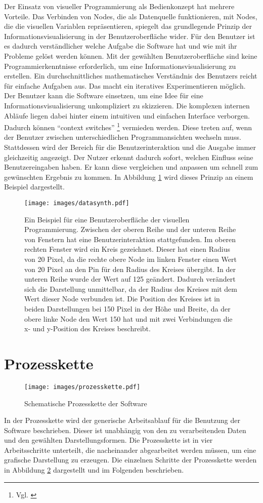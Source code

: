 \documentclass[a4paper, 
               12pt,
               DIV=calc,
               version=first,
               pdftex,
               headsepline,
               footsepline,
               bibliography=totocnumbered,
               listof=numbered]{scrreprt}
\begin{document}
Der Einsatz von visueller Programmierung als Bedienkonzept hat
mehrere Vorteile. Das Verbinden von Nodes, die als Datenquelle funktionieren, mit Nodes, die
die visuellen Variablen repräsentieren, spiegelt das grundlegende
Prinzip der Informationsvisualisierung in der Benutzeroberfläche wider. Für den Benutzer ist
es dadurch verständlicher welche Aufgabe die Software hat und wie mit ihr Probleme gelöst
werden können.
Mit der gewählten Benutzeroberfläche sind keine Programmierkenntnisse erforderlich, um eine Informationsvisualisierung
zu erstellen. Ein durchschnittliches mathematisches Verständnis des Benutzers reicht für einfache Aufgaben aus.
Das macht ein iteratives Experimentieren möglich. Der Benutzer kann die Software einsetzen, um eine
Idee für eine Informationsvisualisierung unkompliziert zu skizzieren.
Die komplexen internen Abläufe liegen dabei hinter einem intuitiven und einfachen Interface
verborgen. Dadurch können "`context switches"' \footnote{Vgl. \citep[S.\,50]{Tufte}}
vermieden werden. Diese treten auf, wenn der Benutzer zwischen unterschiedlichen Programmansichten wechseln
muss. Stattdessen wird der Bereich für die Benutzerinteraktion und die Ausgabe
immer gleichzeitig angezeigt. Der Nutzer erkennt dadurch sofort, welchen Einfluss seine Benutzereingaben haben. Er
kann diese vergleichen und anpassen um schnell zum gewünschten Ergebnis zu kommen.
In Abbildung \ref{fig:datasynth} wird dieses Prinzip an einem Beispiel dargestellt.
\begin{figure}
\centering
\texttt{[image: images/datasynth.pdf]}
\caption{Ein Beispiel für eine Benutzeroberfläche der visuellen Programmierung. Zwischen der oberen Reihe
und der unteren Reihe von Fenstern hat eine Benutzerinteraktion stattgefunden.
Im oberen rechten Fenster wird ein Kreis gezeichnet. Dieser hat einen Radius von 20 Pixel, da
die rechte obere Node im linken Fenster einen Wert von 20 Pixel an den Pin für den Radius des Kreises übergibt.
In der unteren Reihe wurde der Wert auf 125 geändert. Dadurch verändert sich
die Darstellung unmittelbar, da der Radius des Kreises mit dem Wert dieser Node verbunden ist. Die Position
des Kreises ist in beiden Darstellungen bei 150 Pixel in der Höhe und Breite, da der obere linke Node den Wert 150 hat und mit
zwei Verbindungen die x- und y-Position des Kreises beschreibt.}
\label{fig:datasynth}
\end{figure}

\newpage
\section{Prozesskette}
\begin{figure}
\centering
\texttt{[image: images/prozesskette.pdf]}
\caption{Schematische Prozesskette der Software}
\label{fig:prozesskette}
\end{figure}
In der Prozesskette wird der generische Arbeitsablauf für die Benutzung
der Software beschrieben. Dieser ist unabhängig von den zu verarbeitenden Daten
und den gewählten Darstellungsformen. Die Prozesskette ist in vier
Arbeitsschritte unterteilt, die nacheinander abgearbeitet werden müssen,
um eine grafische Darstellung zu erzeugen.
Die einzelnen Schritte der Prozesskette werden in Abbildung \ref{fig:prozesskette} dargestellt und im
Folgenden beschrieben.
\end{document}
